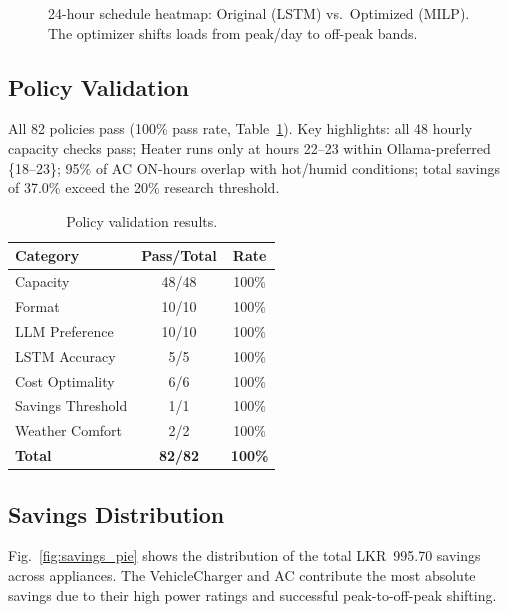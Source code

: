 \documentclass[10pt,a4paper,twocolumn]{article}
\begin{document}
\begin{figure}[b]
    \caption{24-hour schedule heatmap: Original (LSTM) vs.\ Optimized (MILP). The optimizer shifts loads from peak/day to off-peak bands.}
    \label{fig:heatmap}
\end{figure}

\subsection{Policy Validation}
All 82 policies pass (100\% pass rate, Table~\ref{tab:validation}). Key highlights: all 48 hourly capacity checks pass; Heater runs only at hours 22--23 within Ollama-preferred \{18--23\}; 95\% of AC ON-hours overlap with hot/humid conditions; total savings of 37.0\% exceed the 20\% research threshold.

\begin{table}[H]
    \centering
    \caption{Policy validation results.}
    \label{tab:validation}
    \small
    \begin{tabular}{@{}lcc@{}}
        \toprule
        \textbf{Category} & \textbf{Pass/Total} & \textbf{Rate} \\
        \midrule
        Capacity           & 48/48 & 100\% \\
        Format             & 10/10 & 100\% \\
        LLM Preference     & 10/10 & 100\% \\
        LSTM Accuracy      & 5/5   & 100\% \\
        Cost Optimality    & 6/6   & 100\% \\
        Savings Threshold  & 1/1   & 100\% \\
        Weather Comfort    & 2/2   & 100\% \\
        \midrule
        \textbf{Total}     & \textbf{82/82} & \textbf{100\%} \\
        \bottomrule
    \end{tabular}
\end{table}

\subsection{Savings Distribution}
Fig.~\ref{fig:savings_pie} shows the distribution of the total LKR~995.70 savings across appliances. The VehicleCharger and AC contribute the most absolute savings due to their high power ratings and successful peak-to-off-peak shifting.
\end{document}
